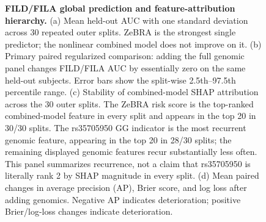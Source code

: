 {\begin{figure}[!t]
\caption{\textbf{FILD/FILA global prediction and feature-attribution hierarchy.} (a) Mean held-out AUC with one standard deviation across 30 repeated outer splits. ZeBRA is the strongest single predictor; the nonlinear combined model does not improve on it. (b) Primary paired regularized comparison: adding the full genomic panel changes FILD/FILA AUC by essentially zero on the same held-out subjects. Error bars show the split-wise 2.5th--97.5th percentile range. (c) Stability of combined-model SHAP attribution across the 30 outer splits. The ZeBRA risk score is the top-ranked combined-model feature in every split and appears in the top 20 in 30/30 splits. The rs35705950 GG indicator is the most recurrent genomic feature, appearing in the top 20 in 28/30 splits; the remaining displayed genomic features recur substantially less often. This panel summarizes recurrence, not a claim that rs35705950 is literally rank 2 by SHAP magnitude in every split. (d) Mean paired changes in average precision (AP), Brier score, and log loss after adding genomics. Negative AP indicates deterioration; positive Brier/log-loss changes indicate deterioration.}
\label{fig:global-evidence}
\end{figure}%
}

